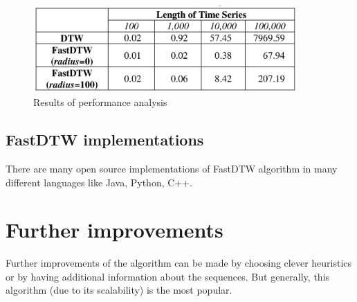 \begin{figure}[H]
  \centerline{\includegraphics[width=0.9\textwidth]{images/dtw_performance.png}}
  \caption[Results of performance analysis]{Results of performance analysis}
  \label{obr:dtw_performance.png}
\end{figure}

\subsection{FastDTW implementations}

There are many open source implementations of FastDTW algorithm in many different languages like
Java, Python, C++.

\section{Further improvements}

Further improvements of the algorithm can be made by choosing clever heuristics or by having
additional information about the sequences. But generally, this algorithm (due to its scalability)
is the most popular.
